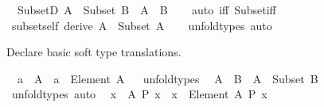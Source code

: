 \begin{isabellebody}
\ \ SubsetD{\isacharcolon}{\kern0pt}\ {\isachardoublequoteopen}A\ {\isacharcolon}{\kern0pt}\ Subset\ B\ {\isasymLongrightarrow}\ A\ {\isasymsubseteq}\ B{\isachardoublequoteclose}\isanewline
%
\isadelimproof
\ \ %
\endisadelimproof
%
\isatagproof
{}\isamarkupfalse%
\ {\isacharparenleft}{\kern0pt}auto\ iff{\isacharcolon}{\kern0pt}\ Subset{\isacharunderscore}{\kern0pt}iff{\isacharparenright}{\kern0pt}%
\endisatagproof
{\isafoldproof}%
%
\isadelimproof
\isanewline
%
\endisadelimproof
\isanewline
{}\isamarkupfalse%
\ subset{\isacharunderscore}{\kern0pt}self\ {\isacharbrackleft}{\kern0pt}derive{\isacharbrackright}{\kern0pt}{\isacharcolon}{\kern0pt}\ {\isachardoublequoteopen}A\ {\isacharcolon}{\kern0pt}\ Subset\ A{\isachardoublequoteclose}\isanewline
%
\isadelimproof
\ \ %
\endisadelimproof
%
\isatagproof
{}\isamarkupfalse%
\ unfold{\isacharunderscore}{\kern0pt}types\ auto%
\endisatagproof
{\isafoldproof}%
%
\isadelimproof
%
\endisadelimproof
%
\begin{isamarkuptext}%
Declare basic soft type translations.%
\end{isamarkuptext}\isamarkuptrue%
\isamarkupfalse%
\isanewline
\ \ {\isachardoublequoteopen}a\ {\isasymin}\ A{\isachardoublequoteclose}\ {\isasymrightleftharpoons}\ {\isachardoublequoteopen}a\ {\isacharcolon}{\kern0pt}\ Element\ A{\isachardoublequoteclose}%
\isadelimproof
\ %
\endisadelimproof
%
\isatagproof
{}\isamarkupfalse%
\ unfold{\isacharunderscore}{\kern0pt}types%
\endisatagproof
{\isafoldproof}%
%
\isadelimproof
%
\endisadelimproof
\isanewline
\isanewline
{}\isamarkupfalse%
\isanewline
\ \ {\isachardoublequoteopen}A\ {\isasymsubseteq}\ B{\isachardoublequoteclose}\ {\isasymrightleftharpoons}\ {\isachardoublequoteopen}A\ {\isacharcolon}{\kern0pt}\ Subset\ B{\isachardoublequoteclose}%
\isadelimproof
\ %
\endisadelimproof
%
\isatagproof
{}\isamarkupfalse%
\ unfold{\isacharunderscore}{\kern0pt}types\ auto%
\endisatagproof
{\isafoldproof}%
%
\isadelimproof
%
\endisadelimproof
\isanewline
\isanewline
{}\isamarkupfalse%
\isanewline
\ \ {\isachardoublequoteopen}{\isasymforall}x\ {\isasymin}\ A{\isachardot}{\kern0pt}\ P\ x{\isachardoublequoteclose}\ {\isasymrightleftharpoons}\ {\isachardoublequoteopen}{\isasymforall}x\ {\isacharcolon}{\kern0pt}\ Element\ A{\isachardot}{\kern0pt}\ P\ x{\isachardoublequoteclose}\isanewline

\end{isabellebody}
